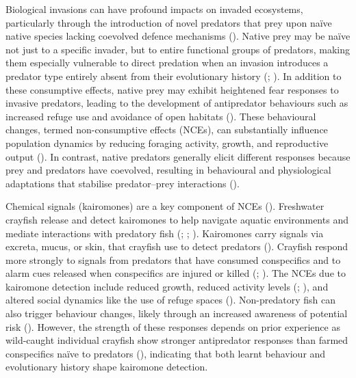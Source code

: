\documentclass[
  letterpaper,
  DIV=11,
  numbers=noendperiod]{scrartcl}
\begin{document}
Biological invasions can have profound impacts on invaded ecosystems,
particularly through the introduction of novel predators that prey upon
naïve native species lacking coevolved defence mechanisms
(). Native prey may be
naïve not just to a specific invader, but to entire functional groups of
predators, making them especially vulnerable to direct predation when an
invasion introduces a predator type entirely absent from their
evolutionary history (;
). In addition to
these consumptive effects, native prey may exhibit heightened fear
responses to invasive predators, leading to the development of
antipredator behaviours such as increased refuge use and avoidance of
open habitats ().
These behavioural changes, termed non-consumptive effects (NCEs), can
substantially influence population dynamics by reducing foraging
activity, growth, and reproductive output
(). In contrast, native
predators generally elicit different responses because prey and
predators have coevolved, resulting in behavioural and physiological
adaptations that stabilise predator--prey interactions
().

Chemical signals (kairomones) are a key component of NCEs
(). Freshwater crayfish
release and detect kairomones to help navigate aquatic environments and
mediate interactions with predatory fish (; ;
). Kairomones carry
signals via excreta, mucus, or skin, that crayfish use to detect
predators ().
Crayfish respond more strongly to signals from predators that have
consumed conspecifics and to alarm cues released when conspecifics are
injured or killed (;
). The NCEs due to
kairomone detection include reduced growth, reduced activity levels
(;
), and
altered social dynamics like the use of refuge spaces
(). Non-predatory fish
can also trigger behaviour changes, likely through an increased
awareness of potential risk ().
However, the strength of these responses depends on prior experience as
wild-caught individual crayfish show stronger antipredator responses
than farmed conspecifics naïve to predators
(), indicating that both learnt
behaviour and evolutionary history shape kairomone detection.
\end{document}
